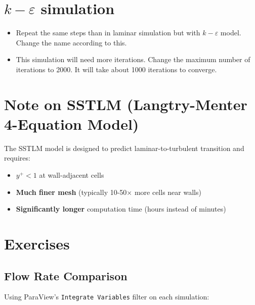 \documentclass[
parskip=half,      %
DIV=12,            %
headings=normal,   %
fontsize=11pt,     %
english            %
]{scrartcl}
\begin{document}
	\section{$k-\varepsilon$ simulation}
	
\begin{itemize}
	\item Repeat the same steps than in laminar simulation but with $k-\varepsilon$ model. Change the name according to this.
	\item This simulation will need more iterations. Change the maximum number of iterations to 2000. It will take about 1000 iterations to converge.
	
\end{itemize}

\section{Note on SSTLM (Langtry-Menter 4-Equation Model)}

The SSTLM model is designed to predict laminar-to-turbulent transition and requires:

\begin{itemize}
	\item \textbf{$y^+ < 1$} at wall-adjacent cells
	\item \textbf{Much finer mesh} (typically 10-50× more cells near walls)
	\item \textbf{Significantly longer} computation time (hours instead of minutes)
\end{itemize}

	
	\section{Exercises}
	
	\subsection{Flow Rate Comparison}
	
	Using ParaView's \texttt{Integrate Variables} filter on each simulation:
	
\end{document}
